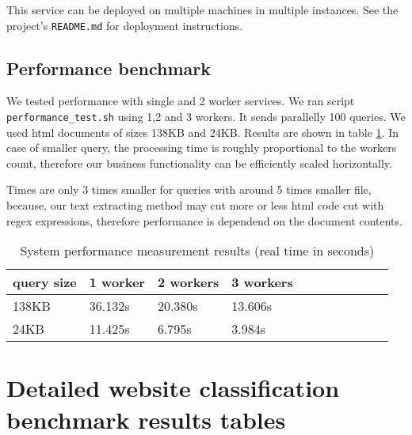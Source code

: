 \documentclass[a4paper]{article}
\begin{document}
This service can be deployed on multiple machines in multiple instances.
See the project's \texttt{README.md} for deployment instructions.

\subsection {Performance benchmark}

We tested performance with single and 2 worker services.
We ran script \texttt{performance\_test.sh} using 1,2 and 3 workers.
It sends parallelly 100 queries.
We used html documents of sizes 138KB and 24KB.
Results are shown in table \ref{table:perf}.
In case of smaller query, the processing time is roughly proportional to the workers count,
therefore our business functionality can be efficiently scaled horizontally.

Times are only 3 times smaller for queries with around 5 times smaller file,
because, our text extracting method may cut
more or less html code cut with regex expressions,
therefore performance is dependend on the document contents.

\begin{table}[!hbt]
    \caption{ System performance measurement results (real time in seconds)
    \label{table:perf}
    }
\footnotesize
\begin{center}
    \begin{tabular}{|l|l|l|l|l|l|l|l|l|l|l|}
    \hline
        query size & 1 worker & 2 workers & 3 workers\\
    \hline
        138KB & 36.132s&20.380s&13.606s\\
    \hline
        24KB &11.425s&6.795s&3.984s\\
    \hline
    \end{tabular}
\end{center}
\end{table}

\newpage
\appendix
\section{Detailed website classification benchmark results tables}
% 

\end{document}
